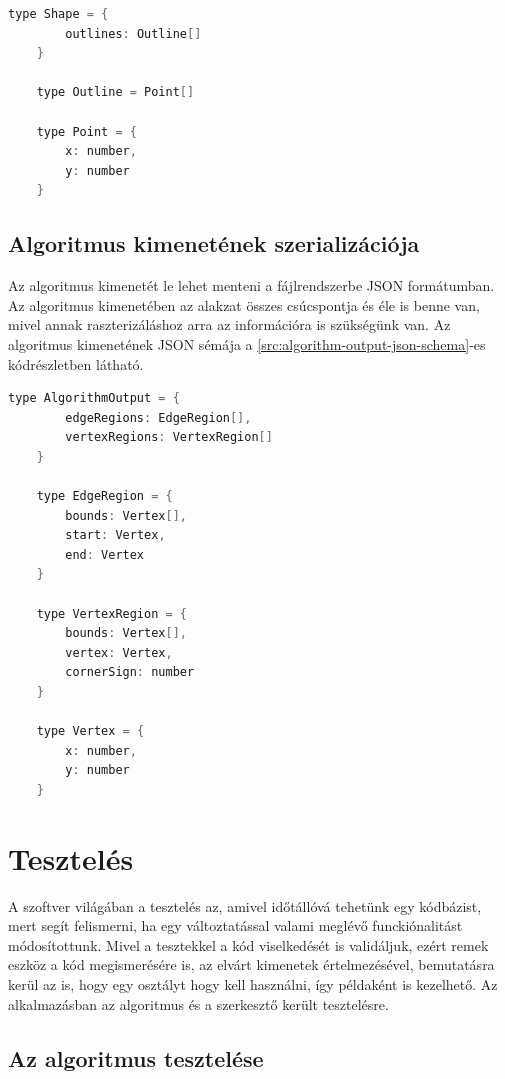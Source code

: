\begin{lstlisting}[language=C]
	type Shape = {
		outlines: Outline[]
	}

	type Outline = Point[]

	type Point = {
		x: number,
		y: number
	}
\end{lstlisting}


\subsection{Algoritmus kimenetének szerializációja}
Az algoritmus kimenetét le lehet menteni a fájlrendszerbe JSON formátumban. Az algoritmus kimenetében az alakzat összes csúcspontja és éle is benne van, mivel annak raszterizáláshoz arra az információra is szükségünk van. Az algoritmus kimenetének JSON sémája a \ref{src:algorithm-output-json-schema}-es kódrészletben látható.

\begin{lstlisting}[language=C]
	type AlgorithmOutput = {
		edgeRegions: EdgeRegion[],
		vertexRegions: VertexRegion[]
	}

	type EdgeRegion = {
		bounds: Vertex[],
		start: Vertex,
		end: Vertex
	}

	type VertexRegion = {
		bounds: Vertex[],
		vertex: Vertex,
		cornerSign: number
	}

	type Vertex = {
		x: number,
		y: number
	}
\end{lstlisting}


\section{Tesztelés}

A szoftver világában a tesztelés az, amivel időtállóvá tehetünk egy kódbázist, mert segít felismerni, ha egy változtatással valami meglévő funckiónalitást módosítottunk. Mivel a tesztekkel a kód viselkedését is validáljuk, ezért remek eszköz a kód megismerésére is, az elvárt kimenetek értelmezésével, bemutatásra kerül az is, hogy egy osztályt hogy kell használni, így példaként is kezelhető.
Az alkalmazásban az algoritmus és a szerkesztő került tesztelésre.

\subsection{Az algoritmus tesztelése}

